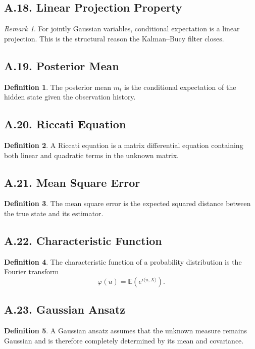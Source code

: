 \documentclass[11pt]{article}
\theoremstyle{definition}
\newtheorem{definition}{Definition}
\theoremstyle{remark}
\newtheorem{remark}{Remark}
\begin{document}
\subsection*{A.18. Linear Projection Property}
\begin{remark}
For jointly Gaussian variables, conditional expectation is a linear projection. This is the structural reason the Kalman--Bucy filter closes.
\end{remark}

\subsection*{A.19. Posterior Mean}
\begin{definition}
The posterior mean \(m_t\) is the conditional expectation of the hidden state given the observation history.
\end{definition}

\subsection*{A.20. Riccati Equation}
\begin{definition}
A Riccati equation is a matrix differential equation containing both linear and quadratic terms in the unknown matrix.
\end{definition}

\subsection*{A.21. Mean Square Error}
\begin{definition}
The mean square error is the expected squared distance between the true state and its estimator.
\end{definition}

\subsection*{A.22. Characteristic Function}
\begin{definition}
The characteristic function of a probability distribution is the Fourier transform
\[
\varphi(u)=\mathbb E(e^{i\langle u,X\rangle}).
\]
\end{definition}

\subsection*{A.23. Gaussian Ansatz}
\begin{definition}
A Gaussian ansatz assumes that the unknown measure remains Gaussian and is therefore completely determined by its mean and covariance.
\end{definition}
\end{document}
